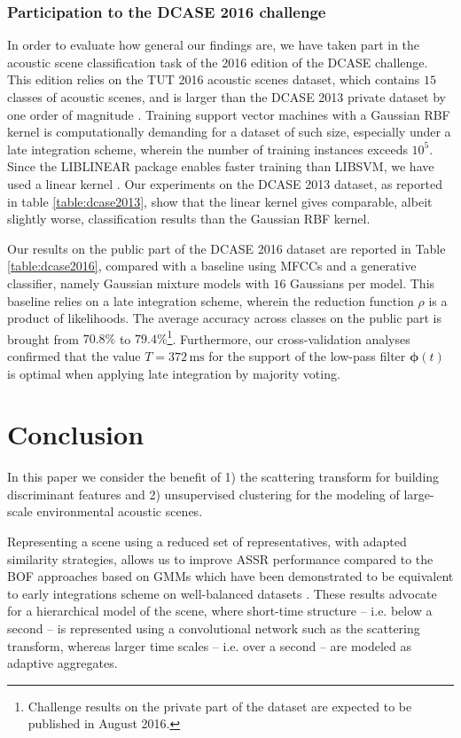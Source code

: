 \documentclass[journal]{IEEEtran}
\makeatletter
\newcommand*{\ie}{i.e.\@\xspace}
\makeatother
\begin{document}
\subsubsection*{Participation to the DCASE 2016 challenge}
In order to evaluate how general our findings are, we have taken part in the acoustic scene classification task of the 2016 edition of the DCASE challenge.
This edition relies on the TUT 2016 acoustic scenes dataset, which contains $15$ classes of acoustic scenes, and is larger than the DCASE 2013 private dataset by one order of magnitude \cite{Mesaros2016_EUSIPCO}.
Training support vector machines with a Gaussian RBF kernel is computationally demanding for a dataset of such size, especially under a late integration scheme, wherein the number of training instances exceeds $10^5$.
Since the LIBLINEAR package enables faster training than LIBSVM, we have used a linear kernel \cite{Hsu2003}.
Our experiments on the DCASE 2013 dataset, as reported in table \ref{table:dcase2013}, show that the linear kernel gives comparable, albeit slightly worse, classification results than the Gaussian RBF kernel.

Our results on the public part of the DCASE 2016 dataset are reported in Table \ref{table:dcase2016}, compared with a baseline using MFCCs and a generative classifier, namely Gaussian mixture models with $16$ Gaussians per model. This baseline relies on a late integration scheme, wherein the reduction function $\rho$ is a product of likelihoods.
The average accuracy across classes on the public part is brought from $70.8\%$ to $79.4\%$\footnote{Challenge results on the private part of the dataset are expected to be published in August 2016.}.
Furthermore, our cross-validation analyses confirmed that the value $T=372\,\mathrm{ms}$ for the support of the low-pass filter $\boldsymbol{\phi}(t)$ is optimal when applying late integration by majority voting.

\section{Conclusion}

In this paper we consider the benefit of 1) the scattering transform for building discriminant features and 2) unsupervised clustering for the modeling of large-scale environmental acoustic scenes.

Representing a scene using a reduced set of representatives, with adapted similarity strategies, allows us to improve ASSR performance compared to the BOF approaches based on GMMs which have been demonstrated to be equivalent to early integrations scheme on well-balanced datasets \cite{lagrange:hal-01082501}. These results advocate for a hierarchical model of the scene, where short-time structure -- \ie below a second -- is represented using a convolutional network such as the scattering transform, whereas larger time scales -- \ie over a second -- are modeled as adaptive aggregates.
\end{document}
